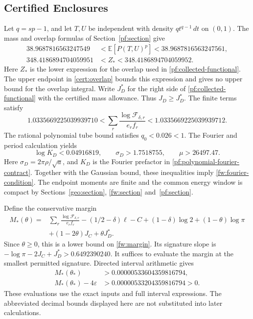 

\subsection{Certified Enclosures}
Let $q=sp-1$, and let $T,U$ be independent with density
$qt^{q-1}\,dt$ on $(0,1)$. The mass and overlap formulas of
Section~\ref{pf:section} give
\begin{align}
38.9687816563247549
 &<\mathbb E[P(T,U)^p]<38.9687816563247561,
 \label{cert:mass}\\
348.4186894704059951
 &<Z_*<348.4186894704059952.
 \label{cert:overlap}
\end{align}
Here $Z_*$ is the lower expression for the overlap used in
\eqref{pf:collected-functional}. The upper endpoint in
\eqref{cert:overlap} bounds this expression and gives no upper bound
for the overlap integral. Write $J_D^*$ for the right side of
\eqref{pf:collected-functional} with the certified mass allowance. Thus
$J_D\ge J_D^*$. The finite terms satisfy
\[
 1.0335669225039939710
 <\sum_r\frac{\log\mathcal F_{\delta,r}}{e_rf_r}
 <1.0335669225039939712.
\]
The rational polynomial tube bound satisfies $q_0<0.026<1$.
The Fourier and period calculation yields
\[
 \log K_D<0.04916819,\qquad \sigma_D>1.7518755,
 \qquad \mu>26497.47.
\]
Here $\sigma_D=2\pi\rho/\sqrt a$, and $K_D$ is the Fourier prefactor
in \eqref{pf:polynomial-fourier-contract}. Together with the Gaussian
bound, these inequalities imply \eqref{fw:fourier-condition}.
The endpoint moments are finite and the common energy window is
compact by Sections~\ref{geo:section}, \ref{fw:section}
and~\ref{pf:section}.

Define the conservative margin
\begin{align*}
 M_*(\theta)={}&\sum_r\frac{\log\mathcal F_{\delta,r}}{e_rf_r}
 -(1/2-\delta)\ell-C+(1-\delta)\log2+(1-\theta)\log\pi\\
 &+(1-2\theta)J_C+\theta J_D^*.
\end{align*}
Since $\theta\ge0$, this is a lower bound on
\eqref{fw:margin}. Its signature slope is
$-\log\pi-2J_C+J_D^*>0.6492390240$. It suffices to evaluate the margin
at the smallest permitted signature. Directed interval arithmetic gives
\begin{align}
 M_*(\theta_*)&>0.00000533604359816794,
 \label{cert:margin}\\
 M_*(\theta_*)-4\varepsilon
 &>0.00000533204359816794>0.
 \label{cert:final-margin}
\end{align}
These evaluations use the exact inputs and full interval expressions.
The abbreviated decimal bounds displayed here are not substituted into
later calculations.

